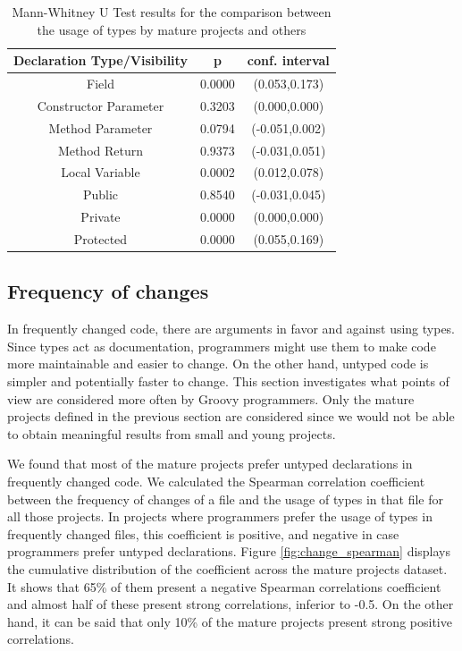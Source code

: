 \documentclass[preprint]{sigplanconf}
\begin{document}
\begin{table}[h!]
\centering{}%
\begin{tabular}{|c|c|c|}
\hline 
Declaration Type/Visibility 		& p & conf. interval \\
\hline 
\hline 
Field                  & 0.0000	& (0.053,0.173)	\\ \hline
Constructor Parameter  & 0.3203	& (0.000,0.000) \\ \hline
Method Parameter       & 0.0794	& (-0.051,0.002) \\ \hline
Method Return          & 0.9373	& (-0.031,0.051) \\ \hline
Local Variable         & 0.0002	& (0.012,0.078)	\\ \hline
\hline 
Public		& 0.8540	& (-0.031,0.045)	\\ \hline
Private		& 0.0000	& (0.000,0.000)		\\ \hline
Protected	& 0.0000	& (0.055,0.169)		\\ 
\hline 
\end{tabular}
\label{tab:size_utest_visibility}
\caption{Mann-Whitney U Test results for the comparison between the usage of types by mature projects and others}
\end{table}	





\subsection{Frequency of changes\label{res-changes}}

In frequently changed code, there are arguments in favor and against using types.
Since types act as documentation, programmers might use them to make code more maintainable and easier to change.
On the other hand, untyped code is simpler and potentially faster to change.
This section investigates what points of view are considered more often by Groovy programmers.
Only the mature projects defined in the previous section are considered since we would not be able to obtain meaningful results from small and young projects.

We found that most of the mature projects prefer untyped declarations in frequently changed code.
We calculated the Spearman correlation coefficient between the frequency of changes of a file and the usage of types in that file for all those projects.
In projects where programmers prefer the usage of types in frequently changed files, this coefficient is positive, and negative in case programmers prefer untyped declarations.
Figure \ref{fig:change_spearman} displays the cumulative distribution of the coefficient across the mature projects dataset.
It shows that 65\% of them present a negative Spearman correlations coefficient and almost half of these present strong correlations, inferior to -0.5.
On the other hand, it can be said that only 10\% of the mature projects present strong positive correlations.
\end{document}
